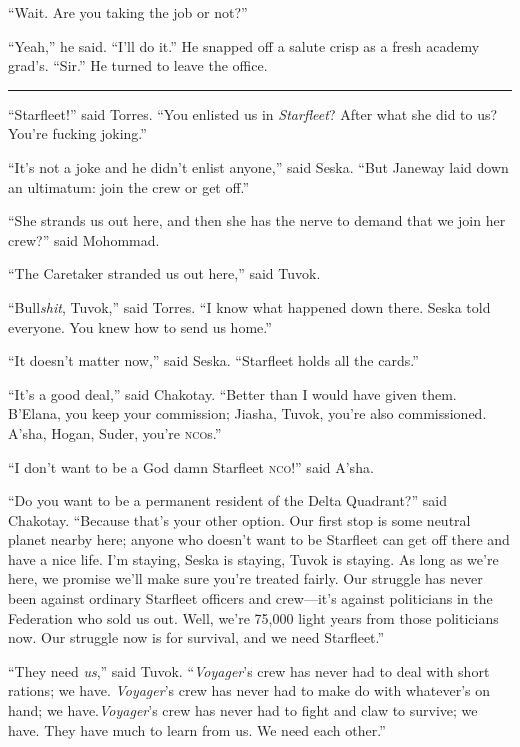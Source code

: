 \documentclass[twoside,letterpaper,12pt]{memoir}
\begin{document}
``Wait. Are you taking the job or not?” 

``Yeah,” he said. ``I’ll do it.” He snapped off a salute crisp as a fresh academy grad’s. ``Sir.” He turned to leave the office. 

\begin{center}\rule{3cm}{0.4 pt}\end{center} 

``Starfleet!” said Torres. ``You enlisted us in \textit{Starfleet}? After what she did to us? You’re fucking joking.” 

``It’s not a joke and he didn’t enlist anyone,” said Seska. ``But Janeway laid down an ultimatum: join the crew or get off.” 

``She strands us out here, and then she has the nerve to demand that we join her crew?” said Mohommad. 

``The Caretaker stranded us out here,” said Tuvok. 

``Bull\textit{shit}, Tuvok,” said Torres. ``I know what happened down there. Seska told everyone. You knew how to send us home.” 

``It doesn’t matter now,” said Seska. ``Starfleet holds all the cards.” 

``It’s a good deal,” said Chakotay. ``Better than I would have given them. B’Elana, you keep your commission; Jiasha, Tuvok, you’re also commissioned. A’sha, Hogan, Suder, you’re \textsc{nco}s.” 

``I don’t want to be a God damn Starfleet \textsc{nco}!” said A’sha. 

``Do you want to be a permanent resident of the Delta Quadrant?” said Chakotay. ``Because that’s your other option. Our first stop is some neutral planet nearby here; anyone who doesn’t want to be Starfleet can get off there and have a nice life. I’m staying, Seska is staying, Tuvok is staying. As long as we’re here, we promise we’ll make sure you’re treated fairly. Our struggle has never been against ordinary Starfleet officers and crew---it’s against politicians in the Federation who sold us out. Well, we’re 75,000 light years from those politicians now. Our struggle now is for survival, and we need Starfleet.” 

``They need \textit{us},” said Tuvok. ``\textit{Voyager}’s crew has never had to deal with short rations; we have. \textit{Voyager}’s crew has never had to make do with whatever’s on hand; we have.\textit{Voyager}’s crew has never had to fight and claw to survive; we have. They have much to learn from us. We need each other.” 
\end{document}
